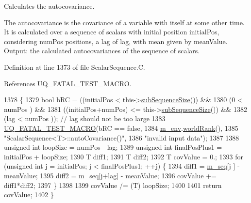 Calculates the autocovariance. 

The autocovariance is the covariance of a variable with itself at some other time. It is calculated over a sequence of scalars with initial position {\ttfamily initial\-Pos}, considering {\ttfamily num\-Pos} positions, a lag of {\ttfamily lag}, with mean given by {\ttfamily mean\-Value}. Output\-: the calculated autocovariances of the sequence of scalars. 

Definition at line 1373 of file Scalar\-Sequence.\-C.



References U\-Q\-\_\-\-F\-A\-T\-A\-L\-\_\-\-T\-E\-S\-T\-\_\-\-M\-A\-C\-R\-O.


\begin{DoxyCode}
1378 \{
1379   \textcolor{keywordtype}{bool} bRC = ((initialPos          <  this->\hyperlink{class_q_u_e_s_o_1_1_scalar_sequence_a0288ea295eedc216a1617b3286f6f3a0}{subSequenceSize}()) &&
1380               (0                   <  numPos                 ) &&
1381               ((initialPos+numPos) <= this->\hyperlink{class_q_u_e_s_o_1_1_scalar_sequence_a0288ea295eedc216a1617b3286f6f3a0}{subSequenceSize}()) &&
1382               (lag                 <  numPos                 )); \textcolor{comment}{// lag should not be too large}
1383   \hyperlink{_defines_8h_a56d63d18d0a6d45757de47fcc06f574d}{UQ\_FATAL\_TEST\_MACRO}(bRC == \textcolor{keyword}{false},
1384                       \hyperlink{class_q_u_e_s_o_1_1_scalar_sequence_a71618cd6351b29361b437af68447a4c8}{m\_env}.\hyperlink{class_q_u_e_s_o_1_1_base_environment_a78b57112bbd0e6dd0e8afec00b40ffa7}{worldRank}(),
1385                       \textcolor{stringliteral}{"ScalarSequence<T>::autoCovariance()"},
1386                       \textcolor{stringliteral}{"invalid input data"});
1387 
1388   \textcolor{keywordtype}{unsigned} \textcolor{keywordtype}{int} loopSize      = numPos - lag;
1389   \textcolor{keywordtype}{unsigned} \textcolor{keywordtype}{int} finalPosPlus1 = initialPos + loopSize;
1390   T diff1;
1391   T diff2;
1392   T covValue = 0.;
1393   \textcolor{keywordflow}{for} (\textcolor{keywordtype}{unsigned} \textcolor{keywordtype}{int} j = initialPos; j < finalPosPlus1; ++j) \{
1394     diff1 = \hyperlink{class_q_u_e_s_o_1_1_scalar_sequence_ae616036fd2e62fb69df167814545e893}{m\_seq}[j    ] - meanValue;
1395     diff2 = \hyperlink{class_q_u_e_s_o_1_1_scalar_sequence_ae616036fd2e62fb69df167814545e893}{m\_seq}[j+lag] - meanValue;
1396     covValue += diff1*diff2;
1397   \}
1398 
1399   covValue /= (T) loopSize;
1400 
1401   \textcolor{keywordflow}{return} covValue;
1402 \}
\end{DoxyCode}

